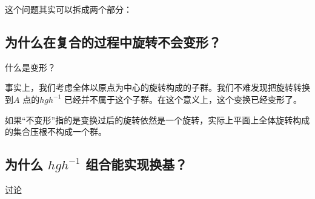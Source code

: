 这个问题其实可以拆成两个部分：
\subsection{为什么在复合的过程中旋转不会变形？}
什么是变形？

事实上，我们考虑全体以原点为中心的旋转构成的子群。我们不难发现把旋转转换到\(A\) 点的\(hgh^{-1}\)
已经并不属于这个子群。在这个意义上，这个变换已经变形了。

如果``不变形''指的是变换过后的旋转依然是一个旋转，实际上平面上全体旋转构成的集合压根不构成一个群。

\subsection{为什么 \(hgh^{-1}\) 组合能实现换基？}

\href{https://math.stackexchange.com/questions/11971/intuition-behind-conjugation-in-group-theory}{讨论}
